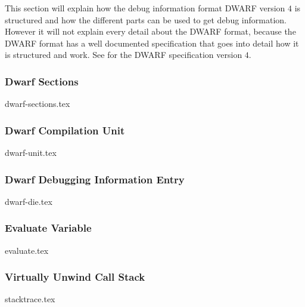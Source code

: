  


This section will explain how the debug information format \acrfull{DWARF} version $4$ is structured and how the different parts can be used to get debug information.
However it will not explain every detail about the \gls{DWARF} format, because the \gls{DWARF} format has a well documented specification that goes into detail how it is structured and work.
See \cite{dwarf} for the \gls{DWARF} specification version $4$.


\subsubsection{Dwarf Sections}
{dwarf-sections.tex}


\subsubsection{Dwarf Compilation Unit}
{dwarf-unit.tex}


\subsubsection{Dwarf Debugging Information Entry}
{dwarf-die.tex}


\subsubsection{Evaluate Variable}
\label{sec:evaluate-variable}
{evaluate.tex}


\subsubsection{Virtually Unwind Call Stack}
\label{sec:stacktrace}
{stacktrace.tex}

